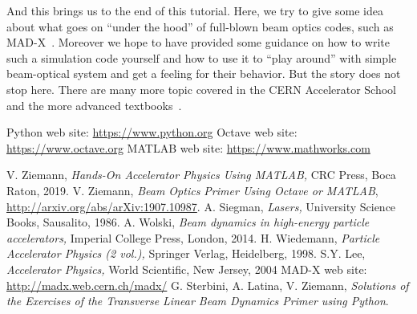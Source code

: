 \documentclass{article}
\begin{document}
And this brings us to the end of this tutorial. Here, we try to give some idea about
what goes on ``under the hood'' of full-blown beam optics codes, such as MAD-X~\cite{MADX}.
Moreover we hope to have provided some guidance on how to write such a simulation code 
yourself and how to use it to ``play around'' with simple beam-optical system and get 
a feeling for their behavior. But the story does not stop here. There are many more topic 
covered in the CERN Accelerator School and the more advanced 
textbooks~\cite{VZAPB,WOLSKI,WIEDEMANN,SYLEE}.
%

\begin{thebibliography}{M}
%
Python web site: \url{https://www.python.org}
%
Octave web site: \url{https://www.octave.org}
%
MATLAB web site: \url{https://www.mathworks.com}

%
V. Ziemann, {\em Hands-On Accelerator Physics Using MATLAB,} CRC Press, Boca Raton, 2019.
%
V. Ziemann, {\em Beam Optics Primer Using Octave or MATLAB},\\ 
\url{http://arxiv.org/abs/arXiv:1907.10987}.
%
A. Siegman, {\em Lasers,} University Science Books, Sausalito, 1986.
%
A. Wolski, {\em Beam dynamics in high-energy particle accelerators,} Imperial College 
Press, London, 2014.
%
H. Wiedemann, {\em Particle Accelerator Physics (2 vol.),} Springer Verlag, Heidelberg, 1998.
%
S.Y. Lee, {\em Accelerator Physics,} World Scientific, New Jersey, 2004
%
MAD-X web site: \url{http://madx.web.cern.ch/madx/}
%
G. Sterbini, A. Latina, V. Ziemann, {\em Solutions of the Exercises of the Transverse Linear Beam Dynamics Primer using Python}.
%
\end{thebibliography}
%
%
\appendix
%
\end{document}

